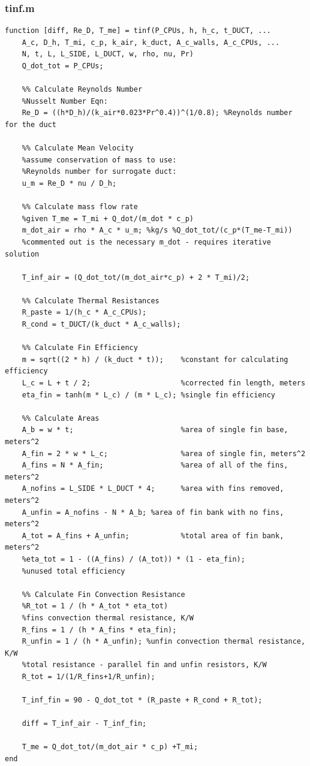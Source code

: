 \documentclass[12pt, titlepage]{article}
\begin{document}
\subsubsection{tinf.m}
\begin{verbatim}
function [diff, Re_D, T_me] = tinf(P_CPUs, h, h_c, t_DUCT, ...
    A_c, D_h, T_mi, c_p, k_air, k_duct, A_c_walls, A_c_CPUs, ...
    N, t, L, L_SIDE, L_DUCT, w, rho, nu, Pr)
    Q_dot_tot = P_CPUs;
    
    %% Calculate Reynolds Number
    %Nusselt Number Eqn:
    Re_D = ((h*D_h)/(k_air*0.023*Pr^0.4))^(1/0.8); %Reynolds number for the duct
    
    %% Calculate Mean Velocity
    %assume conservation of mass to use:
    %Reynolds number for surrogate duct:
    u_m = Re_D * nu / D_h;
    
    %% Calculate mass flow rate
    %given T_me = T_mi + Q_dot/(m_dot * c_p)
    m_dot_air = rho * A_c * u_m; %kg/s %Q_dot_tot/(c_p*(T_me-T_mi))
    %commented out is the necessary m_dot - requires iterative solution
    
    T_inf_air = (Q_dot_tot/(m_dot_air*c_p) + 2 * T_mi)/2;
    
    %% Calculate Thermal Resistances
    R_paste = 1/(h_c * A_c_CPUs);            
    R_cond = t_DUCT/(k_duct * A_c_walls);
    
    %% Calculate Fin Efficiency
    m = sqrt((2 * h) / (k_duct * t));    %constant for calculating efficiency
    L_c = L + t / 2;                     %corrected fin length, meters
    eta_fin = tanh(m * L_c) / (m * L_c); %single fin efficiency
    
    %% Calculate Areas
    A_b = w * t;                         %area of single fin base, meters^2
    A_fin = 2 * w * L_c;                 %area of single fin, meters^2
    A_fins = N * A_fin;                  %area of all of the fins, meters^2
    A_nofins = L_SIDE * L_DUCT * 4;      %area with fins removed, meters^2
    A_unfin = A_nofins - N * A_b; %area of fin bank with no fins, meters^2
    A_tot = A_fins + A_unfin;            %total area of fin bank, meters^2
    %eta_tot = 1 - ((A_fins) / (A_tot)) * (1 - eta_fin);
    %unused total efficiency
    
    %% Calculate Fin Convection Resistance
    %R_tot = 1 / (h * A_tot * eta_tot) 
    %fins convection thermal resistance, K/W
    R_fins = 1 / (h * A_fins * eta_fin);
    R_unfin = 1 / (h * A_unfin); %unfin convection thermal resistance, K/W
    %total resistance - parallel fin and unfin resistors, K/W
    R_tot = 1/(1/R_fins+1/R_unfin);
    
    T_inf_fin = 90 - Q_dot_tot * (R_paste + R_cond + R_tot);
    
    diff = T_inf_air - T_inf_fin;

    T_me = Q_dot_tot/(m_dot_air * c_p) +T_mi;
end
\end{verbatim}
\end{document}
